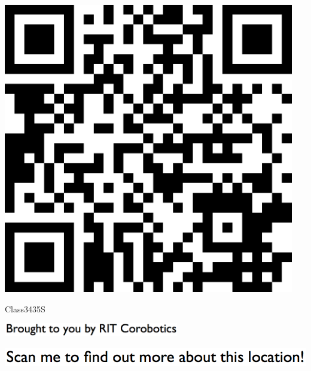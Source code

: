 \documentclass[letterpaper]{article}
\begin{document}
 \begingroup 
 \centerline{\includegraphics[scale=1,width=5in,height=5in]{Class3435S.png}} 
 \endgroup 
 \vspace*{\fill} 

 \hfill{\small Class3435S} 

  \vspace{0.7in} 
 
 \centerline{\includegraphics[scale=1,width=3in]{text-bottom.png}} 
 
 \pagebreak 
{} 
 \vspace*{\fill} 
 
  \centerline{\includegraphics[scale=1,width=6in]{text-top.png}} 
 
 \vspace{0.5in} 
 
\end{document}
